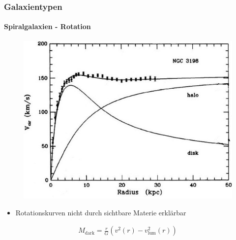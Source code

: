\begin{frame}
\frametitle{Galaxientypen}
\framesubtitle{Spiralgalaxien - Rotation}


\begin{figure}
	\includegraphics[scale=0.35]{Spiralgalaxie_Rotation2.jpg}
\end{figure}

\begin{itemize}
\item Rotationskurven nicht durch sichtbare Materie erklärbar
\end{itemize}


\begin{align*}
M_{\text{dark}} = \frac{r}{G} \left( v^2(r) - v_{\text{lum}}^2(r) \right)
\end{align*}

\end{frame}




